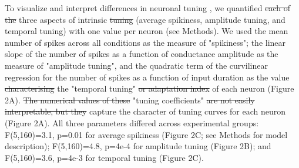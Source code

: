 \documentclass{article}
\providecommand{\DIFaddtex}[1]{{\protect\color{blue}{#1}}} %
\providecommand{\DIFdeltex}[1]{{\protect\color{red}\sout{#1}}}                      %
\providecommand{\DIFaddbegin}{} %
\providecommand{\DIFaddend}{} %
\providecommand{\DIFdelbegin}{} %
\providecommand{\DIFdelend}{} %
\providecommand{\DIFadd}[1]{\texorpdfstring{\DIFaddtex{#1}}{#1}} %
\providecommand{\DIFdel}[1]{\texorpdfstring{\DIFdeltex{#1}}{}} %
\newcommand{\DIFscaledelfig}{0.5}
\newlength{\DIFdelgraphicswidth} %
\newlength{\DIFdelgraphicsheight} %
\newcommand{\DIFaddincludegraphics}[2][]{{\color{blue}\fbox{\DIFOincludegraphics[#1]{#2}}}} %
\newcommand{\DIFdelincludegraphics}[2][]{%
\sbox{\DIFdelgraphicsbox}{\DIFOincludegraphics[#1]{#2}}%
\settoboxwidth{\DIFdelgraphicswidth}{\DIFdelgraphicsbox} %
\settoboxtotalheight{\DIFdelgraphicsheight}{\DIFdelgraphicsbox} %
\scalebox{\DIFscaledelfig}{%
\parbox[b]{\DIFdelgraphicswidth}{\usebox{\DIFdelgraphicsbox}\\[-\baselineskip] \rule{\DIFdelgraphicswidth}{0em}}\llap{\resizebox{\DIFdelgraphicswidth}{\DIFdelgraphicsheight}{%
\setlength{\unitlength}{\DIFdelgraphicswidth}%
\begin{picture}(1,1)%
\thicklines\linethickness{2pt} %
{\color[rgb]{1,0,0}\put(0,0){\framebox(1,1){}}}%
{\color[rgb]{1,0,0}\put(0,0){\line( 1,1){1}}}%
{\color[rgb]{1,0,0}\put(0,1){\line(1,-1){1}}}%
\end{picture}%
}\hspace*{3pt}}} %
} %
\DeclareRobustCommand{\DIFaddbegin}{\DIFOaddbegin \let\includegraphics\DIFaddincludegraphics} %
\DeclareRobustCommand{\DIFaddend}{\DIFOaddend \let\includegraphics\DIFOincludegraphics} %
\DeclareRobustCommand{\DIFdelbegin}{\DIFOdelbegin \let\includegraphics\DIFdelincludegraphics} %
\DeclareRobustCommand{\DIFdelend}{\DIFOaddend \let\includegraphics\DIFOincludegraphics} %
\begin{document}
To \DIFaddbegin \DIFadd{better }\DIFaddend visualize and interpret differences in neuronal tuning \DIFaddbegin \DIFadd{after different types of stimulation}\DIFaddend , we quantified \DIFdelbegin \DIFdel{each of the }\DIFdelend three aspects of intrinsic \DIFdelbegin \DIFdel{tuning }\DIFdelend \DIFaddbegin \DIFadd{excitability }\DIFaddend (average spikiness, amplitude tuning, and temporal tuning) with one value per neuron (see Methods). We used the mean number of spikes across all conditions as the measure of "spikiness"; the linear slope of the number of spikes as a function of conductance amplitude as the measure of "amplitude tuning", and the quadratic term of the curvilinear regression for the number of spikes as a function of input duration as the value \DIFdelbegin \DIFdel{characterising }\DIFdelend \DIFaddbegin \DIFadd{to characterize }\DIFaddend the "temporal tuning" \DIFdelbegin \DIFdel{or adaptation index }\DIFdelend of each neuron (Figure 2A). \DIFdelbegin \DIFdel{The numerical values of these }\DIFdelend \DIFaddbegin \DIFadd{These }\DIFaddend "tuning coefficients" \DIFdelbegin \DIFdel{are not easily interpretable, but they }\DIFdelend capture the character of tuning curves for each neuron (Figure 2A). All three parameters differed across experimental groups: F(5,160)=3.1, p=0.01 for average spikiness (Figure 2C; see Methods for model description); F(5,160)=4.8, p=4e-4 for amplitude tuning (Figure 2B); and F(5,160)=3.6, p=4e-3 for temporal tuning (Figure 2C).
\end{document}
